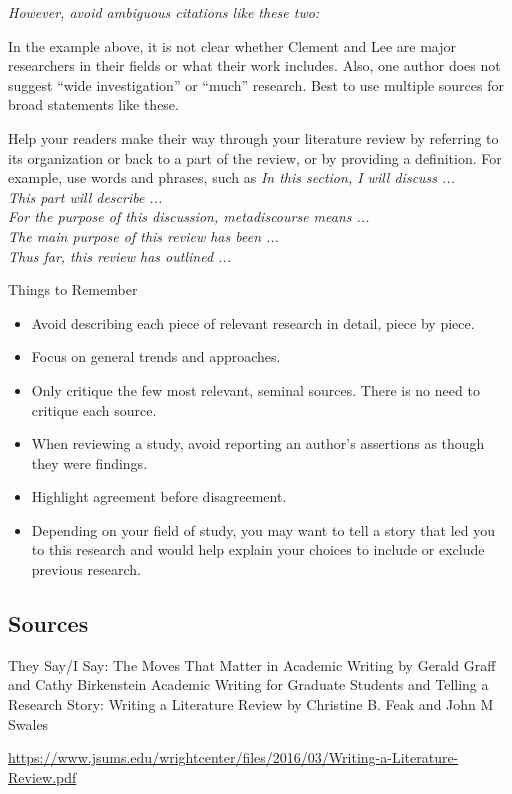 \textit{However, avoid ambiguous citations like these two:}

In the example above, it is not clear whether Clement and Lee are major researchers in their fields
or what their work includes. Also, one author does not suggest “wide investigation” or “much”
research. Best to use multiple sources for broad statements like these.

Help your readers make their way through your literature review by referring to its organization or
back to a part of the review, or by providing a definition. For example, use words and phrases,
such as \textit{In this section, I will discuss ...\\ This part will describe ...\\ For the purpose
	of this discussion, metadiscourse means ...\\ The main purpose of this review has been ...\\ Thus
	far, this review has outlined ...\\}

Things to Remember
\begin{itemize}
	\item Avoid describing each piece of relevant research in detail, piece by piece.
	\item Focus on general trends and approaches.
	\item Only critique the few most relevant, seminal sources. There is no need to critique each source.
	\item When reviewing a study, avoid reporting an author’s assertions as though they were findings.
	\item Highlight agreement before disagreement.
	\item Depending on your field of study, you may want to tell a story that led you to this research and
	      would help explain your choices to include or exclude previous research.
\end{itemize}

\subsection{Sources}
They Say/I Say: The Moves That Matter in Academic Writing by Gerald Graff and Cathy Birkenstein
Academic Writing for Graduate Students and Telling a Research Story: Writing a Literature Review by
Christine B. Feak and John M Swales

\url{https://www.jsums.edu/wrightcenter/files/2016/03/Writing-a-Literature-Review.pdf}

